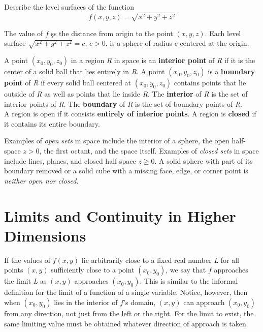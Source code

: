 \documentclass[12pt,a4paper]{article}
\newenvironment{definition}{\begin{definitionbox}}{\end{definitionbox}\vspace{1\baselineskip}}
\begin{document}
\begin{example}
Describe the level surfaces of the function
\[f(x,y,z)=\sqrt{x^{2}+y^{2}+z^{2}}\]
\end{example}

\begin{solution}
    The value of \(f\) şs the distance from origin to the point \((x,y,z)\). 
    Each level surface \(\sqrt{x^{2}+y^{2}+z^{2}} = c\), \(c>0\), is a sphere of radius c centered at the origin.
\end{solution}

\begin{definition}
    A point \((x_0,y_0,z_0)\) in a region \textit{R} in space is an \textbf{interior point} of \textit{R} if it is the center of a solid ball that lies entirely in \textit{R}. 
    A point \((x_0,y_0,z_0)\) is a \textbf{boundary point} of \textit{R} if every solid ball centered at \((x_0,y_0,z_0)\) contains points that lie outside of \textit{R} as well as points that lie inside \textit{R}.
    The \textbf{interior} of \textit{R} is the set of interior points of \textit{R}. The \textbf{boundary} of \textit{R} is the set of boundary points of \textit{R}.\\
    A region is open if it consists \textbf{entirely of interior points}. A region is \textbf{closed} if it contains its entire boundary.

\end{definition}

Examples of \textit{open sets} in space include the interior of a sphere, the open half-space \(z > 0\), the first octant, and the space itself. 
Examples of \textit{closed sets} in space include lines, planes, and closed half space \(z \geq 0\). A solid sphere with part of its boundary removed or a solid cube with a missing face, edge, or corner point is \textit{neither open nor closed}.

\newpage 

\section{Limits and Continuity in Higher Dimensions}

If the values of \(f(x,y)\) lie arbitrarily close to a fixed real number \textit{L} for all points \((x,y)\) sufficiently close to a point \((x_0,y_0)\), we say that \(f\) approaches the limit \textit{L} as \((x,y)\) approaches \((x_0,y_0)\).
This is similar to the informal definition for the limit of a function of a single variable. Notice, however, then when \((x_0,y_0)\) lies in the interior of \(f\)'s domain, \((x,y)\) can approach \((x_0,y_0)\) from any direction, not just from the left or the right. For the limit to exist, the same limiting value must be obtained whatever direction of approach is taken.
\end{document}
